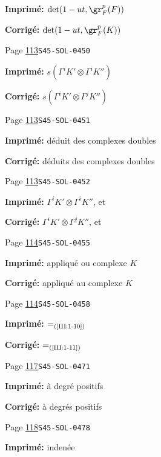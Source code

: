 \begin{description}
\par\noindent\textbf{Imprimé:} \(\det(1-u t,\gr_F^p(F))\)
\par\noindent\textbf{Corrigé:} \(\det(1-u t,\gr_F^p(K))\)
\smallskip
\item[\hypertarget{apparatus:FR-0068}{68}] Page \hyperlink{printpage:fr:113}{113}\quad\texttt{S45-SOL-0450}
\par\noindent\textbf{Imprimé:} \(s(\Gamma^i K'\otimes \Gamma^i K'')\)
\par\noindent\textbf{Corrigé:} \(s(\Gamma^i K'\otimes \Gamma^j K'')\)
\smallskip
\item[\hypertarget{apparatus:FR-0069}{69}] Page \hyperlink{printpage:fr:113}{113}\quad\texttt{S45-SOL-0451}
\par\noindent\textbf{Imprimé:} déduit des complexes doubles
\par\noindent\textbf{Corrigé:} déduits des complexes doubles
\smallskip
\item[\hypertarget{apparatus:FR-0070}{70}] Page \hyperlink{printpage:fr:113}{113}\quad\texttt{S45-SOL-0452}
\par\noindent\textbf{Imprimé:} $\Gamma^i K'\otimes \Gamma^i K''$, et
\par\noindent\textbf{Corrigé:} $\Gamma^i K'\otimes \Gamma^j K''$, et
\smallskip
\item[\hypertarget{apparatus:FR-0071}{71}] Page \hyperlink{printpage:fr:114}{114}\quad\texttt{S45-SOL-0455}
\par\noindent\textbf{Imprimé:} appliqué ou complexe $K$
\par\noindent\textbf{Corrigé:} appliqué au complexe $K$
\smallskip
\item[\hypertarget{apparatus:FR-0072}{72}] Page \hyperlink{printpage:fr:114}{114}\quad\texttt{S45-SOL-0458}
\par\noindent\textbf{Imprimé:} \(=_{\text{(\ref{III:1-10})}}\)
\par\noindent\textbf{Corrigé:} \(=_{\text{(\ref{III:1-11})}}\)
\smallskip
\item[\hypertarget{apparatus:FR-0073}{73}] Page \hyperlink{printpage:fr:117}{117}\quad\texttt{S45-SOL-0471}
\par\noindent\textbf{Imprimé:} à degré positifs
\par\noindent\textbf{Corrigé:} à degrés positifs
\smallskip
\item[\hypertarget{apparatus:FR-0074}{74}] Page \hyperlink{printpage:fr:118}{118}\quad\texttt{S45-SOL-0478}
\par\noindent\textbf{Imprimé:} indenée

\end{description}
